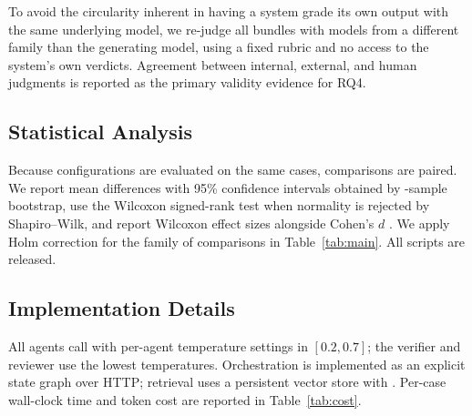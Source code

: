 To avoid the circularity inherent in having a system grade its own output with
the same underlying model, we re-judge all bundles with  models from
a different family than the generating model, using a fixed rubric and no
access to the system's own verdicts. Agreement between internal, external, and
human judgments is reported as the primary validity evidence for RQ4.

\subsection{Statistical Analysis}

Because configurations are evaluated on the same cases, comparisons are
paired. We report mean differences with 95\% confidence intervals obtained by
-sample bootstrap, use the Wilcoxon signed-rank test when
normality is rejected by Shapiro--Wilk, and report Wilcoxon effect sizes
alongside Cohen's $d$ \cite{cohen2013statistical}. We apply Holm correction
for the family of comparisons in Table~\ref{tab:main}. All scripts are
released.

\subsection{Implementation Details}

All agents call  with per-agent
temperature settings in $[0.2,0.7]$; the verifier and reviewer use the lowest
temperatures. Orchestration is implemented as an explicit state graph over
HTTP; retrieval uses a persistent vector store with . Per-case wall-clock time and token cost are
reported in Table~\ref{tab:cost}.
